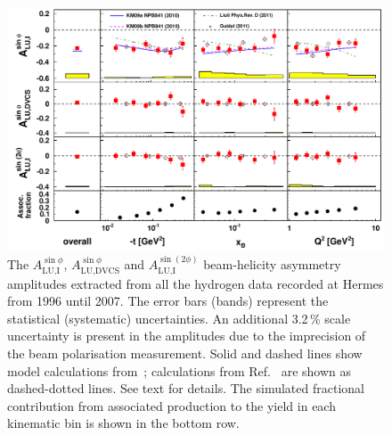 \begin{figure}
 \begin{center}
 \includegraphics[width=15cm]{bsadvcsplots_eml_par13_bin6_release_all_pic_cluster_update2}
  \caption{The $A_{\textrm{LU,I}}^{\sin\phi}$, $A_{\textrm{LU,DVCS}}^{\sin\phi}$ and
$A_{\textrm{LU,I}}^{\sin(2\phi)}$ beam-helicity asymmetry amplitudes extracted from all the hydrogen data recorded at H{\sc ermes}
from 1996 until 2007. The error bars (bands) represent the statistical
(systematic) uncertainties. An additional 3.2\,\% scale uncertainty is present in the amplitudes due to the imprecision of
the beam polarisation measurement. Solid and dashed lines show model calculations from~\cite{Kum09}; calculations from Ref.~\cite{Liu11} are shown as dashed-dotted lines. See text for details. The simulated fractional contribution from associated production to the yield in each kinematic bin is shown in the bottom row.}
  \label{bsa_xbjrange}
 \end{center}
\end{figure}

